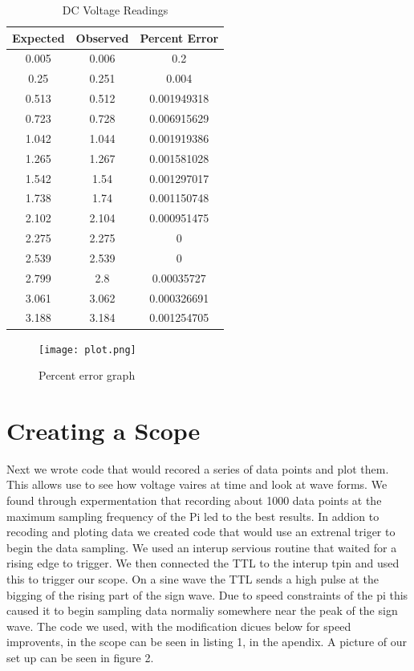 \documentclass[prl,12pt,notitlepage,aps,onecolumn,superscriptaddress]{revtex4-1}
\begin{document}
\begin{table}[h]
  \centering
  \caption{DC Voltage Readings}
    \begin{tabular}{c|c|c}
    \toprule
    Expected & Observed & Percent Error \\
    \midrule
    0.005 & 0.006 & 0.2 \\
    0.25  & 0.251 & 0.004 \\
    0.513 & 0.512 & 0.001949318 \\
    0.723 & 0.728 & 0.006915629 \\
    1.042 & 1.044 & 0.001919386 \\
    1.265 & 1.267 & 0.001581028 \\
    1.542 & 1.54  & 0.001297017 \\
    1.738 & 1.74  & 0.001150748 \\
    2.102 & 2.104 & 0.000951475 \\
    2.275 & 2.275 & 0 \\
    2.539 & 2.539 & 0 \\
    2.799 & 2.8   & 0.00035727 \\
    3.061 & 3.062 & 0.000326691 \\
    3.188 & 3.184 & 0.001254705 \\
    \bottomrule
    \end{tabular}%
  \label{tab:addlabel}%
\end{table}%

\begin{figure}[h]
\begin{center}
\texttt{[image: plot.png]}
\end{center}
\caption{\label{fig:pic} Percent error graph}
\end{figure}

\section{Creating a Scope}
Next we wrote code that would recored a series of data points and plot them. This allows use to see how voltage vaires at time and look at wave forms. We found through expermentation that recording about 1000 data points at the maximum sampling frequency of the Pi led to the best results. In addion to recoding and ploting data we created code that would use an extrenal triger to begin the data sampling. We used an interup servious routine that waited for a rising edge to trigger. We then connected the TTL to the interup tpin and used this to trigger our scope. On a sine wave the TTL sends a high pulse at the bigging of the rising part of the sign wave. Due to speed constraints of the pi this caused it to begin sampling data normaliy somewhere near the peak of the sign wave. The code we used, with the modification dicues below for speed improvents, in the scope can be seen in listing 1, in the apendix. A picture of our set up can be seen in figure 2.
\end{document}
